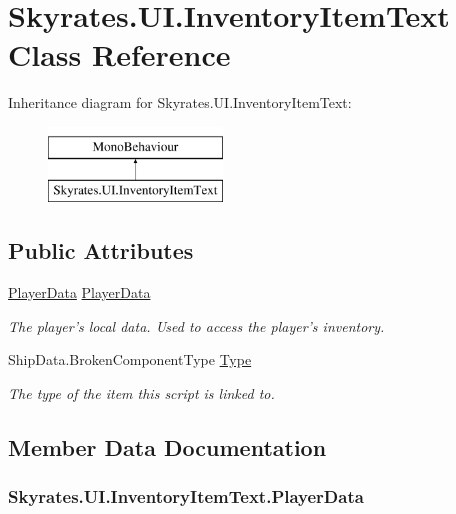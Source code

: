 \hypertarget{class_skyrates_1_1_u_i_1_1_inventory_item_text}{\section{Skyrates.\-U\-I.\-Inventory\-Item\-Text Class Reference}
\label{class_skyrates_1_1_u_i_1_1_inventory_item_text}
}
Inheritance diagram for Skyrates.\-U\-I.\-Inventory\-Item\-Text\-:\begin{figure}[H]
\begin{center}
\leavevmode
\includegraphics[height=2.000000cm]{class_skyrates_1_1_u_i_1_1_inventory_item_text}
\end{center}
\end{figure}
\subsection*{Public Attributes}
\begin{DoxyCompactItemize}
\item 
\hyperlink{class_skyrates_1_1_data_1_1_player_data}{Player\-Data} \hyperlink{class_skyrates_1_1_u_i_1_1_inventory_item_text_aa4218e0be35c0464bd47187a76fffd3e}{Player\-Data}
\begin{DoxyCompactList}\small\item\em The player's local data. Used to access the player's inventory. \end{DoxyCompactList}\item 
Ship\-Data.\-Broken\-Component\-Type \hyperlink{class_skyrates_1_1_u_i_1_1_inventory_item_text_a926107c4f0a5d755960f835e663b7d9a}{Type}
\begin{DoxyCompactList}\small\item\em The type of the item this script is linked to. \end{DoxyCompactList}\end{DoxyCompactItemize}


\subsection{Member Data Documentation}
\hypertarget{class_skyrates_1_1_u_i_1_1_inventory_item_text_aa4218e0be35c0464bd47187a76fffd3e}{
\subsubsection[{Player\-Data}]{ Skyrates.\-U\-I.\-Inventory\-Item\-Text.\-Player\-Data}}\label{class_skyrates_1_1_u_i_1_1_inventory_item_text_aa4218e0be35c0464bd47187a76fffd3e}


